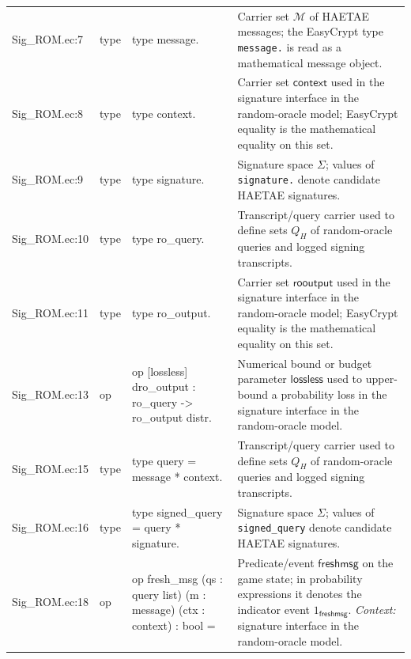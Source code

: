 \documentclass[10pt]{article}
\newcommand{\EC}[1]{\texttt{#1}}
\begin{document}
\begin{longtable}{L{0.11\textwidth}L{0.055\textwidth}L{0.385\textwidth}L{0.41\textwidth}}
Sig\_\allowbreak{}ROM.\allowbreak{}ec:\allowbreak{}7 & type & {\ttfamily\scriptsize type message.} & Carrier set $\mathcal M$ of HAETAE messages; the EasyCrypt type \EC{message.} is read as a mathematical message object. \\
Sig\_\allowbreak{}ROM.\allowbreak{}ec:\allowbreak{}8 & type & {\ttfamily\scriptsize type context.} & Carrier set $\mathsf{context}$ used in the signature interface in the random-oracle model; EasyCrypt equality is the mathematical equality on this set. \\
Sig\_\allowbreak{}ROM.\allowbreak{}ec:\allowbreak{}9 & type & {\ttfamily\scriptsize type signature.} & Signature space $\Sigma$; values of \EC{signature.} denote candidate HAETAE signatures. \\
Sig\_\allowbreak{}ROM.\allowbreak{}ec:\allowbreak{}10 & type & {\ttfamily\scriptsize type ro\_\allowbreak{}query.} & Transcript/query carrier used to define sets $Q_H$ of random-oracle queries and logged signing transcripts. \\
Sig\_\allowbreak{}ROM.\allowbreak{}ec:\allowbreak{}11 & type & {\ttfamily\scriptsize type ro\_\allowbreak{}output.} & Carrier set $\mathsf{rooutput}$ used in the signature interface in the random-oracle model; EasyCrypt equality is the mathematical equality on this set. \\
Sig\_\allowbreak{}ROM.\allowbreak{}ec:\allowbreak{}13 & op & {\ttfamily\scriptsize op [lossless] dro\_\allowbreak{}output : ro\_\allowbreak{}query -\textgreater{} ro\_\allowbreak{}output distr.} & Numerical bound or budget parameter $\mathsf{lossless}$ used to upper-bound a probability loss in the signature interface in the random-oracle model. \\
Sig\_\allowbreak{}ROM.\allowbreak{}ec:\allowbreak{}15 & type & {\ttfamily\scriptsize type query = message * context.} & Transcript/query carrier used to define sets $Q_H$ of random-oracle queries and logged signing transcripts. \\
Sig\_\allowbreak{}ROM.\allowbreak{}ec:\allowbreak{}16 & type & {\ttfamily\scriptsize type signed\_\allowbreak{}query = query * signature.} & Signature space $\Sigma$; values of \EC{signed\_query} denote candidate HAETAE signatures. \\
Sig\_\allowbreak{}ROM.\allowbreak{}ec:\allowbreak{}18 & op & {\ttfamily\scriptsize op fresh\_\allowbreak{}msg (qs : query list) (m : message) (ctx : context) : bool =} & Predicate/event $\mathsf{freshmsg}$ on the game state; in probability expressions it denotes the indicator event $1_{\mathsf{freshmsg}}$. \emph{Context:} signature interface in the random-oracle model. \\

\end{longtable}
\end{document}
